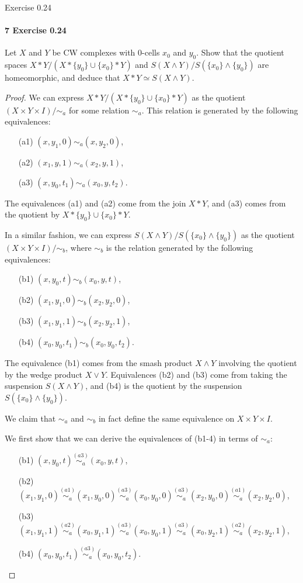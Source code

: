 \documentclass[12pt]{article}
\newlength{\myparskip}
\newenvironment{fullbox}{\begin{lrbox}{\savefullbox}\begin{minipage}{\dimexpr\textwidth-2\fboxsep\relax}\setlength{\parskip}{\myparskip}}{\end{minipage}\end{lrbox}\framebox[\textwidth]{\usebox{\savefullbox}}}
\newenvironment{pbox}[1][]{\begin{fullbox}\ifx#1\empty\else\paragraph{#1}\phantom{}\fi}{\end{fullbox}}
\theoremstyle{definition}
\newcommand{\<}{\langle}
\renewcommand{\>}{\rangle}
\newcommand{\htpy}{\simeq}
\begin{document}
\newpage
\begin{pbox}[7 Exercise 0.24]
    Let $X$ and $Y$ be CW complexes with $0$-cells $x_0$ and $y_0$.
    Show that the quotient spaces $X * Y / (X * \{y_0\} \cup \{x_0\} * Y)$ and $S(X \wedge Y) / S(\{x_0\} \wedge \{y_0\})$ are homeomorphic, and deduce that $X * Y \htpy S(X \wedge Y)$.
\end{pbox}

\begin{proof}
    We can express $X * Y / (X * \{y_0\} \cup \{x_0\} * Y)$ as the quotient $(X \times Y \times I)/{\sim_a}$ for some relation $\sim_a$.
    This relation is generated by the following equivalences:
    \begin{enumerate}
        \item[(a1)] $(x, y_1, 0) \sim_a (x, y_2, 0)$,
        \item[(a2)] $(x_1, y, 1) \sim_a (x_2, y, 1)$,
        \item[(a3)] $(x, y_0, t_1) \sim_a (x_0, y, t_2)$.
    \end{enumerate}
    The equivalences (a1) and (a2) come from the join $X * Y$, and (a3) comes from the quotient by $X * \{y_0\} \cup \{x_0\} * Y$.

    In a similar fashion, we can express $S(X \wedge Y) / S(\{x_0\} \wedge \{y_0\})$ as the quotient $(X \times Y \times I)/{\sim_b}$, where $\sim_b$ is the relation generated by the following equivalences:
    \begin{enumerate}
        \item [(b1)] $(x, y_0, t) \sim_b (x_0, y, t)$,
        \item [(b2)] $(x_1, y_1, 0) \sim_b (x_2, y_2, 0)$,
        \item [(b3)] $(x_1, y_1, 1) \sim_b (x_2, y_2, 1)$,
        \item [(b4)] $(x_0, y_0, t_1) \sim_b (x_0, y_0, t_2)$.
    \end{enumerate}
    The equivalence (b1) comes from the smash product $X \wedge Y$ involving the quotient by the wedge product $X \vee Y$.
    Equivalences (b2) and (b3) come from taking the suspension $S(X \wedge Y)$, and (b4) is the quotient by the suspension $S(\{x_0\} \wedge \{y_0\})$.

    We claim that $\sim_a$ and $\sim_b$ in fact define the same equivalence on $X \times Y \times I$.

    We first show that we can derive the equivalences of (b1-4) in terms of $\sim_a$:
    \begin{enumerate}
        \item[(b1)] $(x, y_0, t) \overset{(a3)}{\sim_a} (x_0, y, t)$,
        \item[(b2)] $(x_1, y_1, 0) \overset{(a1)}{\sim_a} (x_1, y_0, 0) \overset{(a3)}{\sim_a} (x_0, y_0, 0) \overset{(a3)}{\sim_a} (x_2, y_0, 0) \overset{(a1)}{\sim_a} (x_2, y_2, 0)$,
        \item[(b3)] $(x_1, y_1, 1) \overset{(a2)}{\sim_a} (x_0, y_1, 1) \overset{(a3)}{\sim_a} (x_0, y_0, 1) \overset{(a3)}{\sim_a} (x_0, y_2, 1) \overset{(a2)}{\sim_a} (x_2, y_2, 1)$,
        \item[(b4)] $(x_0, y_0, t_1) \overset{(a3)}{\sim_a} (x_0, y_0, t_2)$. 
    \end{enumerate}


\end{proof}
\end{document}
